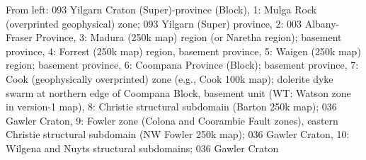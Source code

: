 From left: 093 Yilgarn Craton (Super)-province (Block), 1: Mulga Rock (overprinted geophysical) zone; 093 Yilgarn (Super) province, 2: 003 Albany-Fraser Province, 3: Madura (250k map) region (or Naretha region); basement province, 4: Forrest (250k map) region, basement province, 5: Waigen (250k map) region; basement province, 6: Coompana Province (Block); basement province, 7: Cook (geophysically overprinted) zone (e.g., Cook 100k map); dolerite dyke swarm at northern edge of Coompana Block, basement unit (WT: Watson zone in version-1 map), 8: Christie structural subdomain (Barton 250k map); 036 Gawler Craton, 9: Fowler zone (Colona and Coorambie Fault zones), eastern Christie structural subdomain (NW Fowler 250k map); 036 Gawler Craton, 10: Wilgena and Nuyts structural subdomains; 036 Gawler Craton
